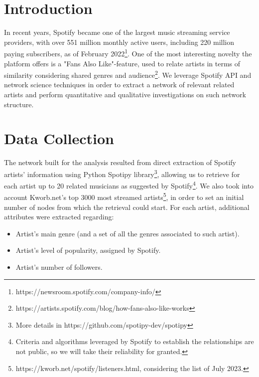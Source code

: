 \documentclass[sigchi]{acmart}
\begin{document}
%


%
\maketitle

\section{Introduction}
In recent years, Spotify became one of the largest music streaming service providers, with over 551 million monthly active users, including 220 million paying subscribers, as of February 2022\footnote{https://newsroom.spotify.com/company-info/}. One of the most interesting novelty the platform offers is a "Fans Also Like"-feature, used to relate artists in terms of similarity considering shared genres and audience\footnote{https://artists.spotify.com/blog/how-fans-also-like-works}. We leverage Spotify API and network science techniques in order to extract a network of relevant related artists and perform quantitative and qualitative investigations on such network structure. 

\section{Data Collection}
The network built for the analysis resulted from direct extraction of Spotify artists' information using Python Spotipy library\footnote{More details in https://github.com/spotipy-dev/spotipy}, allowing us to retrieve for each artist up to 20 related musicians as suggested by Spotify\footnote{Criteria and algorithms leveraged by Spotify to establish the relationships are not public, so we will take their reliability for granted.}. We also took into account Kworb.net's top 3000 most streamed artists\footnote{https://kworb.net/spotify/listeners.html, considering the list of July 2023.}, in order to set an initial number of nodes from which the retrieval could start. For each artist, additional attributes were extracted regarding:

\begin{itemize}
  \item Artist's main genre (and a set of all the genres associated to such artist).
  \item Artist's level of popularity, assigned by Spotify.
  \item Artist's number of followers.
\end{itemize}
\end{document}
